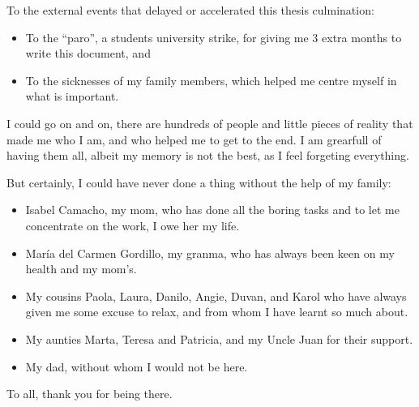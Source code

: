 \documentclass[
11pt, %
english, %
singlespacing, %
headsepline, %
]{MastersDoctoralThesis} %
\providecommand{\tightlist}{%
  \setlength{\itemsep}{0pt}\setlength{\parskip}{0pt}}
\begin{document}
\begin{acknowledgements}
To the external events that delayed or accelerated this thesis culmination:

\begin{itemize}
\tightlist
\item To the \enquote{paro}, a students university strike, for giving me 3 extra months to
  write this document,  and
\item To the sicknesses of my family members, which helped me centre myself in what is
  important.
\end{itemize}

I could go on and on, there are hundreds of people and little pieces of
reality that made me who I am, and who helped me to get to the end. I am
grearfull of having them all, albeit my memory is not the best, as I
feel forgeting everything.

But certainly, I could have never done a thing without the help of my
family:

\begin{itemize}
\tightlist
\item Isabel Camacho, my mom, who has done all the boring tasks and to let me concentrate
  on the work, I owe her my life.
\item María del Carmen Gordillo, my granma, who has always been keen on my health and my
  mom's.
\item My cousins Paola, Laura, Danilo, Angie, Duvan, and Karol who have always given me
  some excuse to relax, and from whom I have learnt so much about.
\item My aunties Marta, Teresa and Patricia, and my Uncle Juan for their support.
\item My dad, without whom I would not be here.
\end{itemize}

To all, thank you for being there.

\end{acknowledgements}


\tableofcontents %




\end{document}
